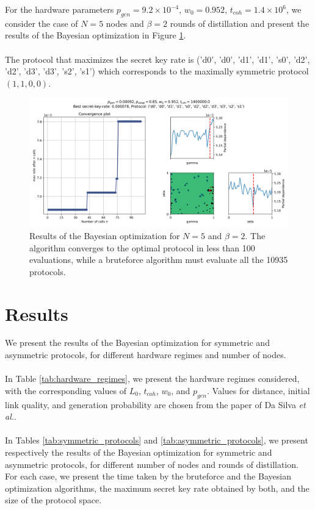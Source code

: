 \documentclass{article}
\begin{document}
For the hardware parameters $p_{gen} = 9.2 \times 10^{-4}$, $w_0 = 0.952$, $t_{coh} = 1.4 \times 10^6$, we consider the case of $N=5$ nodes and $\beta=2$ rounds of distillation and present the results of the Bayesian optimization in Figure \ref{fig:gp_validation}.
\\\\
The protocol that maximizes the secret key rate is
  ('d0', 'd0', 'd1', 'd1', 's0', 'd2', 'd2', 'd3', 'd3', 's2', 's1')
which corresponds to the maximally symmetric protocol $(1,1,0,0)$.

\begin{figure}[ht!]
  \centering
  \includegraphics[width=\linewidth, trim=10 10 10 40, clip]{asymmetric/gp5,2/skopt_gp.png}
  \caption{Results of the Bayesian optimization for $N=5$ and $\beta=2$. The algorithm converges to the optimal protocol in less than 100 evaluations, while a bruteforce algorithm must evaluate all the 10935 protocols.}
  \label{fig:gp_validation} 
\end{figure}

\clearpage
\section*{Results}

We present the results of the Bayesian optimization for symmetric and asymmetric protocols, for different hardware regimes and number of nodes.
\\\\
In Table \ref{tab:hardware_regimes}, we present the hardware regimes considered, with the corresponding values of $L_0$, $t_{coh}$, $w_0$, and $p_{gen}$. Values for distance, initial link quality, and generation probability are chosen from the paper of Da Silva \textit{et al.}.
\\\\
In Tables \ref{tab:symmetric_protocols} and \ref{tab:asymmetric_protocols}, we present respectively the results of the Bayesian optimization for symmetric and asymmetric protocols, for different number of nodes and rounds of distillation. For each case, we present the time taken by the bruteforce and the Bayesian optimization algorithms, the maximum secret key rate obtained by both, and the size of the protocol space.
\end{document}
